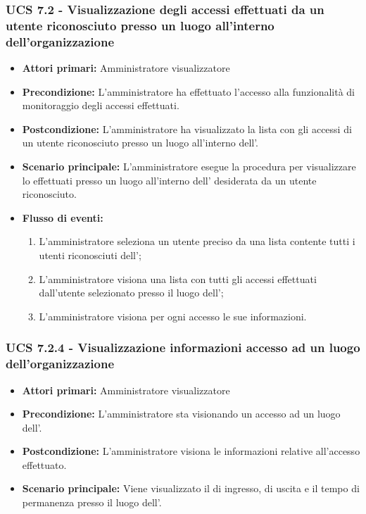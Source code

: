 \subsubsection{UCS 7.2 - Visualizzazione degli accessi effettuati da un utente riconosciuto presso un luogo all'interno dell'organizzazione}
\begin{itemize}
	\item \textbf{Attori primari:} Amministratore visualizzatore
	\item \textbf{Precondizione:} L'amministratore ha effettuato l'accesso alla funzionalità di monitoraggio degli accessi effettuati.
	\item \textbf{Postcondizione:} L'amministratore ha visualizzato la lista con gli accessi di un utente riconosciuto presso un luogo all'interno dell'.
	\item \textbf{Scenario principale:} L'amministratore esegue la procedura per visualizzare lo  effettuati presso un luogo all'interno dell' desiderata da un utente riconosciuto.
	\item \textbf{Flusso di eventi:}
	\begin{enumerate}
		\item L'amministratore seleziona un utente preciso da una lista contente tutti i utenti riconosciuti dell';
		\item L'amministratore visiona una lista con tutti gli accessi effettuati dall'utente selezionato presso il luogo dell';
		\item L'amministratore visiona per ogni accesso le sue informazioni.
	\end{enumerate}
\end{itemize}

\subsubsection{UCS 7.2.4 - Visualizzazione informazioni accesso ad un luogo dell'organizzazione}
\begin{itemize}
	\item \textbf{Attori primari:} Amministratore visualizzatore
	\item \textbf{Precondizione:} L'amministratore sta visionando un accesso ad un luogo dell'.
	\item \textbf{Postcondizione:} L'amministratore visiona le informazioni relative all'accesso effettuato.
	\item \textbf{Scenario principale:} Viene visualizzato il  di ingresso, di uscita e il tempo di permanenza presso il luogo dell'.
\end{itemize}

